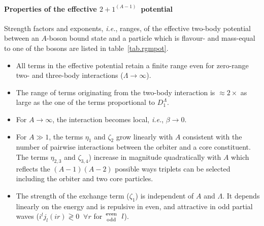 \documentclass[onecolumn,preprint,superscriptaddress,nofootinbib,notitlepage,10pt,linenumbers]{revtex4-1}
\newcommand*{\mprime}{^{\prime}\mkern-1.2mu}
\newcommand*{\mdprime}{^{\prime\prime}\mkern-1.2mu}
\newcommand{\ie}{\textit{i.e.}\;}
\newcommand{\abb}{\ensuremath{2\!+\!1^{(A-1)}}}
\newcommand{\tabref}[1]{table~\ref{#1}}
\begin{document}
\paragraph*{Properties of the effective \abb~potential}
Strength factors and exponents, \ie, ranges, of the effective two-body potential between an
$A$-boson bound state and a particle which is flavour- and mass-equal to one of the bosons are
listed in \tabref{tab.rgmpot}.
\begin{itemize}
\item All terms in the effective potential retain a finite range even for zero-range two- and three-body
interactions ($\Lambda\to\infty$).
\item The range of terms originating from the two-body interaction is $\approx 2\times$ as large as the one
of the terms proportional to $D_1^\Lambda$.
\item For $A\to\infty$, the interaction becomes local, \ie, $\beta\to0$.
\item For $A\gg1$, the terms $\eta_1$ and $\zeta_2$ grow linearly with $A$ consistent with the number
of pairwise interactions between the orbiter and a core constituent. The terms
$\eta_{2,3}$ and $\zeta_{3,4}$) increase in magnitude quadratically with $A$ which reflects the $(A-1)(A-2)$
possible ways triplets can be selected including the orbiter and two core particles.
\item The strength of the exchange term ($\zeta_1$) is independent of $A$ and $\Lambda$. It depends linearly
on the energy and is repulsive in even, and attractive in odd partial waves ($i^lj_l(ir)\gtrless0\;\;\forall r$ for ${\text{even}\atop\text{odd}}\;\;l$).
\end{itemize}

% 
%
\newpage
\end{document}
